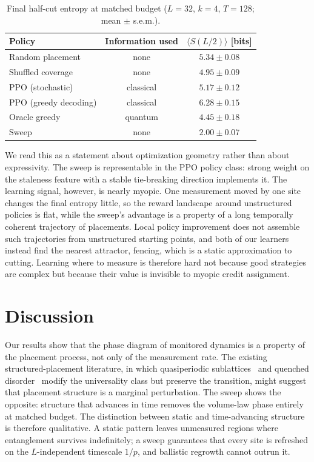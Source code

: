 \documentclass[aps,prb,twocolumn,superscriptaddress,nofootinbib]{revtex4-2}
\begin{document}
\begin{table}
\caption{Final half-cut entropy at matched budget
($L = 32$, $k = 4$, $T = 128$; mean $\pm$ s.e.m.).}
\label{tab:learned}
\begin{ruledtabular}
\begin{tabular}{lcc}
Policy & Information used & $\langle S(L/2)\rangle$ [bits] \\
\hline
Random placement       & none      & $5.34 \pm 0.08$ \\
Shuffled coverage      & none      & $4.95 \pm 0.09$ \\
PPO (stochastic)       & classical & $5.17 \pm 0.12$ \\
PPO (greedy decoding)  & classical & $6.28 \pm 0.15$ \\
Oracle greedy          & quantum   & $4.45 \pm 0.18$ \\
Sweep                  & none      & $2.00 \pm 0.07$ \\
\end{tabular}
\end{ruledtabular}
\end{table}

We read this as a statement about optimization geometry rather than about
expressivity. The sweep is representable in the PPO policy class: strong
weight on the staleness feature with a stable tie-breaking direction
implements it. The learning signal, however, is nearly myopic. One
measurement moved by one site changes the final entropy little, so the
reward landscape around unstructured policies is flat, while the sweep's
advantage is a property of a long temporally coherent trajectory of
placements. Local policy improvement does not assemble such trajectories
from unstructured starting points, and both of our learners instead find
the nearest attractor, fencing, which is a static approximation to
cutting. Learning where to measure is therefore hard not because good
strategies are complex but because their value is invisible to myopic
credit assignment.

\section{Discussion}
\label{sec:discussion}

Our results show that the phase diagram of monitored dynamics is a
property of the placement process, not only of the measurement rate. The
existing structured-placement literature, in which quasiperiodic
sublattices~\cite{Shkolnik2023} and quenched disorder~\cite{Zabalo2023}
modify the universality class but preserve the transition, might suggest
that placement structure is a marginal perturbation. The sweep shows the
opposite: structure that advances in time removes the volume-law phase
entirely at matched budget. The distinction between static and
time-advancing structure is therefore qualitative. A static pattern
leaves unmeasured regions where entanglement survives indefinitely; a
sweep guarantees that every site is refreshed on the $L$-independent
timescale $1/p$, and ballistic regrowth cannot outrun it.
\end{document}
